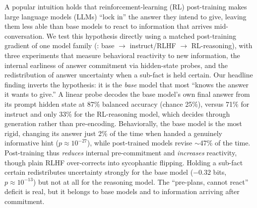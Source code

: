 A popular intuition holds that reinforcement-learning (RL) post-training makes large
language models (LLMs) ``lock in'' the answer they intend to give, leaving them less able
than base models to react to information that arrives mid-conversation. We test this
hypothesis directly using a matched post-training gradient of one model family
(\qwenbase: base $\rightarrow$ instruct/RLHF $\rightarrow$ RL-reasoning), with three
experiments that measure behavioral reactivity to new information, the internal earliness
of answer commitment via hidden-state probes, and the redistribution of answer uncertainty
when a sub-fact is held certain. Our headline finding inverts the hypothesis: it is the
\emph{base} model that most ``knows the answer it wants to give.'' A linear probe decodes
the base model's own final answer from its prompt hidden state at 87\% balanced accuracy
(chance 25\%), versus 71\% for instruct and only 33\% for the RL-reasoning model, which
decides through generation rather than pre-encoding. Behaviorally, the base model is the
most rigid, changing its answer just 2\% of the time when handed a genuinely informative
hint ($p\approx10^{-27}$), while post-trained models revise $\sim$47\% of the time.
Post-training thus \emph{reduces} internal pre-commitment and \emph{increases} reactivity,
though plain RLHF over-corrects into sycophantic flipping. Holding a sub-fact certain
redistributes uncertainty strongly for the base model ($-0.32$ bits, $p\approx10^{-13}$)
but not at all for the reasoning model. The ``pre-plans, cannot react'' deficit is real,
but it belongs to base models and to information arriving after commitment.
